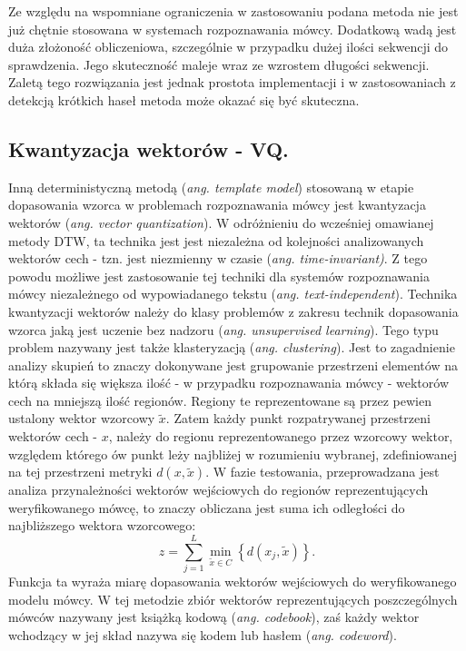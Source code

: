 Ze względu na wspomniane ograniczenia w zastosowaniu podana metoda nie jest już chętnie stosowana w systemach rozpoznawania mówcy. Dodatkową wadą jest duża złożoność obliczeniowa, szczególnie w przypadku dużej ilości sekwencji do sprawdzenia. Jego skuteczność maleje wraz ze wzrostem długości sekwencji. Zaletą tego rozwiązania jest jednak prostota implementacji i w zastosowaniach z detekcją krótkich haseł metoda może okazać się być skuteczna.

\subsection{Kwantyzacja wektorów - VQ.}
\label{vq}

Inną deterministyczną metodą (\textit{ang. template model}) stosowaną w etapie dopasowania wzorca w problemach rozpoznawania mówcy jest kwantyzacja wektorów (\textit{ang. vector quantization}). W odróżnieniu do wcześniej omawianej metody DTW, ta technika jest jest niezależna od kolejności analizowanych wektorów cech - tzn. jest niezmienny w czasie (\textit{ang. time-invariant)}. Z tego powodu możliwe jest zastosowanie tej techniki dla systemów rozpoznawania mówcy niezależnego od wypowiadanego tekstu (\textit{ang. text-independent}). 
Technika kwantyzacji wektorów należy do klasy problemów z zakresu technik dopasowania wzorca jaką jest uczenie bez nadzoru  (\textit{ang. unsupervised learning}). Tego typu problem nazywany jest także \cite{fosr} klasteryzacją (\textit{ang. clustering}). Jest to zagadnienie analizy skupień to znaczy dokonywane jest grupowanie przestrzeni elementów na którą składa się większa ilość - w przypadku rozpoznawania mówcy - wektorów cech na mniejszą ilość regionów. Regiony te reprezentowane są przez pewien ustalony wektor wzorcowy $ \tilde{x}$. Zatem każdy punkt rozpatrywanej przestrzeni wektorów cech - $x$, należy do regionu reprezentowanego przez wzorcowy wektor, względem którego ów punkt leży najbliżej w rozumieniu wybranej, zdefiniowanej na tej przestrzeni metryki $d(x,\tilde{x})$.
W fazie testowania, przeprowadzana jest analiza przynależności wektorów wejściowych do regionów reprezentujących weryfikowanego mówcę, to znaczy obliczana jest suma ich odległości do najbliższego wektora wzorcowego:
\begin{equation}
  z = \sum_{j=1}^{L} \min_{\tilde{x} \in  C} \left\{ d(x_j, \tilde{x}) \right\}. 
\end{equation}
Funkcja ta wyraża miarę dopasowania wektorów wejściowych do weryfikowanego modelu mówcy. 
W tej metodzie zbiór wektorów reprezentujących poszczególnych mówców nazywany jest książką kodową (\textit{ang. codebook}), zaś każdy wektor wchodzący w jej skład nazywa się kodem lub hasłem (\textit{ang. codeword}).

